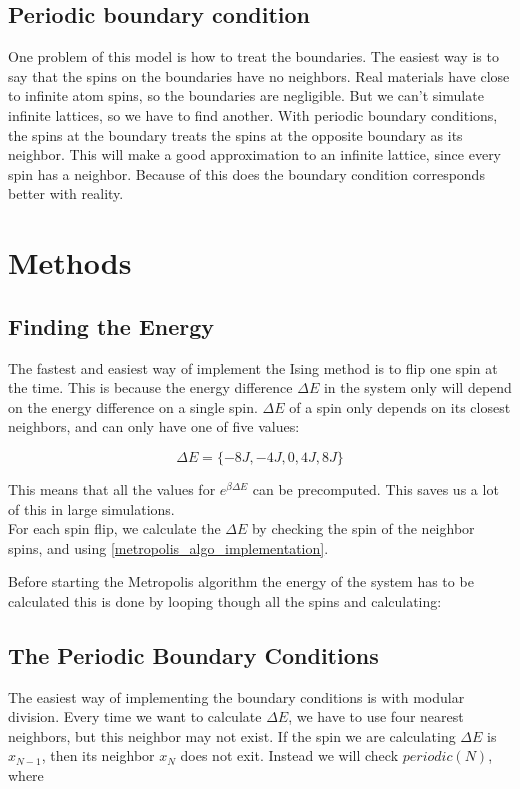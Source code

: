 \documentclass[a4paper, 10pt]{article}
\begin{document}
\subsection{Periodic boundary condition}
One problem of this model is how to treat the boundaries. The easiest way is to say that the spins on the boundaries have no neighbors. Real materials have close to infinite atom spins, so the boundaries are negligible. But we can't simulate infinite lattices, so we have to find another. With periodic boundary conditions, the spins at the boundary treats the spins at the opposite boundary as its neighbor. This will make a good approximation to an infinite lattice, since every spin has a neighbor. Because of this does the boundary condition corresponds better with reality.








\section{Methods}
\subsection{Finding the Energy}\label{energy_in_system}
The fastest and easiest way of implement the Ising method is to flip one spin at the time. This is because the energy difference $\Delta E$ in the system only will depend on the energy difference on a single spin. $\Delta E$ of a spin only depends on its closest neighbors, and can only have one of five values:

$$\Delta E = \{ -8J, -4J, 0, 4J, 8J\}$$

This means that all the values for $e^{\beta \Delta E}$ can be precomputed. This saves us a lot of this in large simulations.\\

For each spin flip, we calculate the $\Delta E$ by checking the spin of the neighbor spins, and using \ref{metropolis_algo_implementation}.

Before starting the Metropolis algorithm the energy of the system has to be calculated this is done by looping though all the spins and calculating:



\subsection{The Periodic Boundary Conditions}
The easiest way of implementing the boundary conditions is with modular division. Every time we want to calculate $\Delta E$, we have to use four nearest neighbors, but this neighbor may not exist. If the spin we are calculating $\Delta E$ is $x_{N-1}$, then its neighbor $x_{N}$ does not exit. Instead we will check $periodic({N})$, where 
\end{document}
